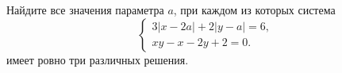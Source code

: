 \begin{ex}
	\begin{condition}
		Найдите все значения параметра \( a \), при каждом из которых система
		\[ \left\{
		\begin{array}{l}
			3|x-2a|+2|y-a|=6,\\
			xy-x-2y+2=0.
		\end{array}
		\right. \]
		имеет ровно три различных решения.
	\end{condition}
\end{ex}